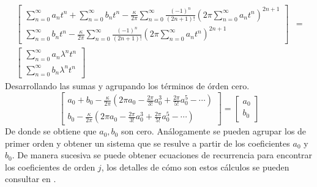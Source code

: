\begin{align*}
	\left[
	\begin{array}{c}
		\sum_{n=0}^{\infty}a_{n}t^{n} + \sum_{n=0}^{\infty}b_{n}t^{n}-\frac{\kappa}{2\pi}\sum_{n=0}^{\infty}\frac{(-1)^{n}}{(2n+1)!}\left(2\pi \sum_{n=0}^{\infty}a_{n}t^{n}\right)^{2n+1}\\
		\sum_{n=0}^{\infty}b_{n}t^{n}-\frac{\kappa}{2\pi}\sum_{n=0}^{\infty}\frac{(-1)^{n}}{(2n+1)!}\left(2\pi\sum_{n=0}^{\infty}a_{n}t^{n}\right)^{2n+1}
	\end{array}	\right]
	&=\\
	\left[
	\begin{array}{c}
		\sum_{n=0}^{\infty}a_{n}\lambda^{n}t^{n} \\
		\sum_{n=0}^{\infty}b_{n}\lambda^{n}t^{n}
	\end{array}
	\right]
\end{align*}
Desarrollando las sumas y agrupando los t\'erminos de \'orden cero.
\begin{equation}
	\left[
	\begin{array}{c}
	
			a_{0}+b_{0}-\frac{\kappa}{2\pi}\left(2\pi a_{0}-\frac{2\pi}{3!} 	a_{0}^{3}+\frac{2\pi}{5!} a_{0}^{5}-\cdots
			\right)\\
			b_{0}-\frac{\kappa}{2\pi}\left(2\pi a_{0}-\frac{2\pi}{3!}a_{0}^{3}+\frac{2\pi}{5!}a_{0}^{5}-\cdots\right)
	\end{array}
	\right]=
	\left[
	\begin{array}{c}
		a_{0}\\
		b_{0}
	\end{array}
	\right]
\end{equation}
De donde se obtiene que $a_{0},b_{0}$ son cero. An\'alogamente se pueden agrupar los de primer orden y obtener un sistema que se resulve a partir de los coeficientes $a_{0}$ y $b_{0}$. De manera sucesiva se puede obtener ecuaciones de recurrencia para encontrar los coeficientes de orden $j$, los detalles de c\'omo son estos c\'alculos se pueden consultar en \cite{eve}.


